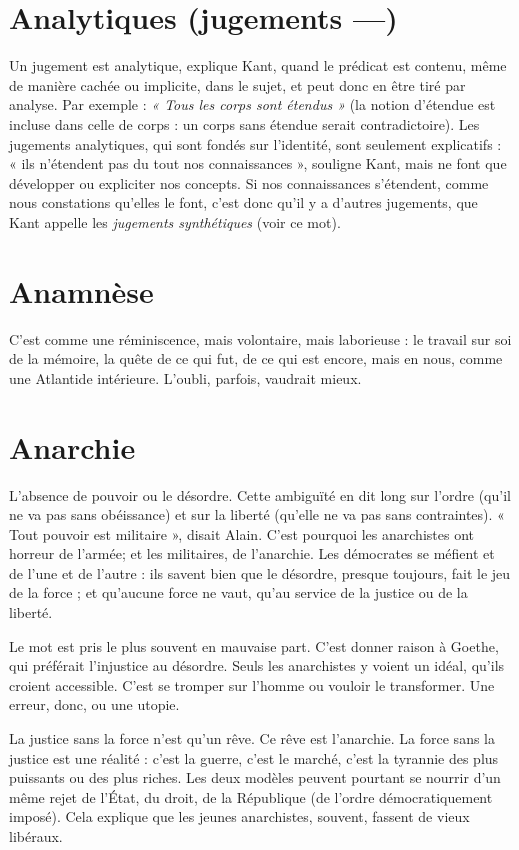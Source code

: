 \section{Analytiques (jugements —)}
Un jugement est analytique, explique Kant,
quand le prédicat est contenu, même de
manière cachée ou implicite, dans le sujet, et peut donc en être tiré par analyse.
Par exemple : {\it « Tous les corps sont étendus »} (la notion d’étendue est incluse dans
celle de corps : un corps sans étendue serait contradictoire). Les jugements analytiques,
qui sont fondés sur l'identité, sont seulement explicatifs : « ils n’étendent
pas du tout nos connaissances », souligne Kant, mais ne font que développer
ou expliciter nos concepts. Si nos connaissances s'étendent, comme
nous constations qu’elles le font, c’est donc qu’il y a d’autres jugements, que
Kant appelle les {\it jugements synthétiques} (voir ce mot).

\section{Anamnèse}
C’est comme une réminiscence, mais volontaire, mais laborieuse :
le travail sur soi de la mémoire, la quête de ce qui fut,
de ce qui est encore, mais en nous, comme une Atlantide intérieure. L’oubli,
parfois, vaudrait mieux.

\section{Anarchie}
L'absence de pouvoir ou le désordre. Cette ambiguïté en dit
long sur l’ordre (qu’il ne va pas sans obéissance) et sur la liberté
(qu’elle ne va pas sans contraintes). « Tout pouvoir est militaire », disait Alain.
C’est pourquoi les anarchistes ont horreur de l’armée; et les militaires, de
l'anarchie. Les démocrates se méfient et de l’une et de l’autre : ils savent bien
que le désordre, presque toujours, fait le jeu de la force ; et qu'aucune force ne
vaut, qu’au service de la justice ou de la liberté.

Le mot est pris le plus souvent en mauvaise part. C’est donner raison à
Goethe, qui préférait l'injustice au désordre. Seuls les anarchistes y voient un
idéal, qu’ils croient accessible. C’est se tromper sur l’homme ou vouloir le
transformer. Une erreur, donc, ou une utopie.

La justice sans la force n’est qu’un rêve. Ce rêve est l’anarchie. La force sans
la justice est une réalité : c’est la guerre, c’est le marché, c’est la tyrannie des
plus puissants ou des plus riches. Les deux modèles peuvent pourtant se nourrir
d’un même rejet de l’État, du droit, de la République (de l’ordre démocratiquement
imposé). Cela explique que les jeunes anarchistes, souvent, fassent de
vieux libéraux.

